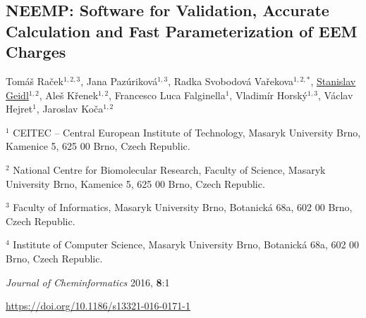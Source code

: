 \begin{center}

\section{NEEMP: Software
for Validation, Accurate Calculation and Fast Parameterization of EEM Charges}

Tomáš Raček$^{1,2,3}$, Jana Pazúriková$^{1,3}$, Radka Svobodová Vařekova$^{1,2,*}$,
\underline{Stanislav Geidl$^{1,2}$}, Aleš Křenek$^{1,2}$, Francesco Luca
Falginella$^1$, Vladimír Horský$^{1,3}$, Václav Hejret$^1$, Jaroslav Koča$^{1,2}$


\vspace{1cm}


$^1$ CEITEC -- Central European Institute of Technology,
Masaryk University Brno, Kamenice 5, 625 00 Brno, Czech Republic.

$^2$ National Centre for Biomolecular Research, Faculty of Science,
Masaryk University Brno, Kamenice 5, 625 00 Brno, Czech Republic.

$^3$ Faculty of Informatics, Masaryk University Brno, Botanická 68a, 602 00 Brno,
Czech Republic.

$^4$ Institute of Computer Science, Masaryk University Brno, Botanická 68a,
602 00 Brno, Czech Republic.

\vspace{1cm}

\textit{Journal of Cheminformatics} 2016, \textbf{8}:1

\vspace{1cm}

\url{https://doi.org/10.1186/s13321-016-0171-1}

\end{center}


